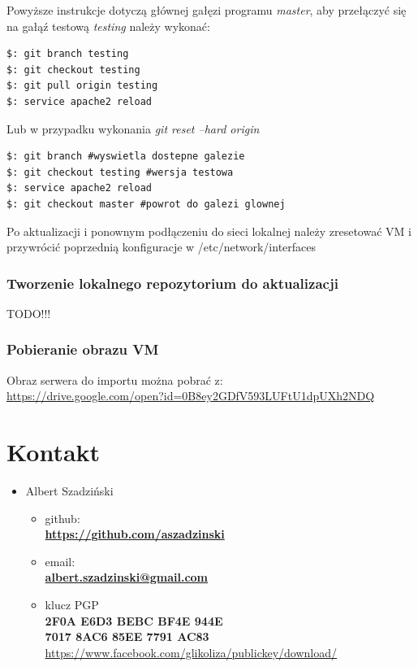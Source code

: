 \documentclass[12pt,a4paper]{article}
\begin{document}
Powyższe instrukcje dotyczą głównej gałęzi programu \textit{master}, aby przełączyć się na gałąź testową \textit{testing} należy wykonać:
\begin{lstlisting}
$: git branch testing
$: git checkout testing
$: git pull origin testing
$: service apache2 reload
\end{lstlisting}
Lub w przypadku wykonania \textit{git reset --hard origin}
\begin{lstlisting}
$: git branch #wyswietla dostepne galezie
$: git checkout testing #wersja testowa
$: service apache2 reload
$: git checkout master #powrot do galezi glownej
\end{lstlisting}
Po aktualizacji i ponownym podłączeniu do sieci lokalnej należy zresetować VM i przywrócić poprzednią konfiguracje w /etc/network/interfaces
\subsubsection{Tworzenie lokalnego repozytorium do aktualizacji}
\begin{center}
TODO!!!
\end{center}
\subsubsection{Pobieranie obrazu VM}
Obraz serwera do importu można pobrać z:\\
 \url{https://drive.google.com/open?id=0B8ey2GDfV593LUFtU1dpUXh2NDQ}

\newpage
\section{Kontakt}
\begin{itemize}
\item Albert Szadziński\\
\begin{itemize}
\item github:\\ \textbf{\url{https://github.com/aszadzinski}}
\item email:\\ \textbf{\url{albert.szadzinski@gmail.com}}
\item klucz PGP\\
\textbf{2F0A E6D3 BEBC BF4E 944E\\
7017 8AC6 85EE 7791 AC83\\}
\url{https://www.facebook.com/glikoliza/publickey/download/}
\end{itemize}
\end{itemize}
\newpage
\end{document}
